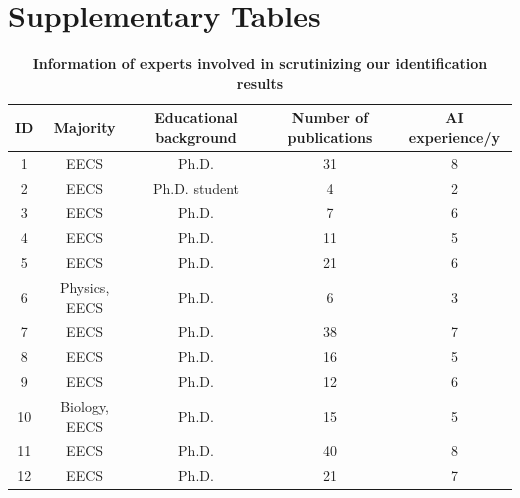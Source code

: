 \clearpage
\section*{Supplementary Tables}
\begin{table}[ht]
\caption{\textbf{Information of experts involved in scrutinizing our identification results}}
\centering
\begin{tabular}{@{}ccccc@{}}
\hline
ID & Majority      & Educational background & Number of publications & AI experience/y \\ \hline
1  & EECS          & Ph.D.                    & 31                     & 8                                 \\
2  & EECS          & Ph.D. student            & 4                      & 2                                 \\
3  & EECS          & Ph.D.                    & 7                      & 6                                 \\
4  & EECS          & Ph.D.                    & 11                     & 5                                 \\
5  & EECS          & Ph.D.                    & 21                     & 6                                 \\
6  & Physics, EECS & Ph.D.                    & 6                      & 3                                 \\
7  & EECS          & Ph.D.                    & 38                     & 7                                 \\
8  & EECS          & Ph.D.                    & 16                     & 5                                 \\
9  & EECS          & Ph.D.                    & 12                     & 6                                 \\
10 & Biology, EECS & Ph.D.                    & 15                     & 5                                 \\
11 & EECS          & Ph.D.                    & 40                     & 8                                 \\
12 & EECS          & Ph.D.                    & 21                     & 7                                 \\ \hline
\end{tabular}
\label{tab1}
\end{table}


